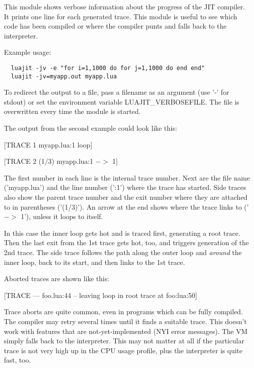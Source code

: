 This module shows verbose information about the progress of the
JIT compiler. It prints one line for each generated trace. This module
is useful to see which code has been compiled or where the compiler
punts and falls back to the interpreter.

Example usage:

\begin{lstlisting}
  luajit -jv -e "for i=1,1000 do for j=1,1000 do end end"
  luajit -jv=myapp.out myapp.lua
\end{lstlisting}
To redirect the output to a file, pass a
filename as an argument (use '-' for stdout) or set the environment
variable LUAJIT\_VERBOSEFILE. The file is overwritten every time the
module is started.

The output from the second example could look like this:

\begin{center}
[TRACE   1 myapp.lua:1 loop]

[TRACE   2 (1/3) myapp.lua:1 $->$ 1]
\end{center}

The first number in each line is the internal trace number. Next are
the file name ('myapp.lua') and the line number (':1') where the
trace has started. Side traces also show the parent trace number and
the exit number where they are attached to in parentheses ('(1/3)').
An arrow at the end shows where the trace links to ('$->$ 1'), unless
it loops to itself.

In this case the inner loop gets hot and is traced first, generating
a root trace. Then the last exit from the 1st trace gets hot, too,
and triggers generation of the 2nd trace. The side trace follows the
path along the outer loop and \textit{around} the inner loop, back to its
start, and then links to the 1st trace.

Aborted traces are shown like this:
\begin{center}
[TRACE --- foo.lua:44 -- leaving loop in root trace at foo:lua:50]
\end{center}

Trace aborts are quite common, even in programs which
can be fully compiled. The compiler may retry several times until it
finds a suitable trace. This doesn't work with features that are
not-yet-implemented (NYI error messages). The VM simply falls back to the
interpreter. This may not matter at all if the particular trace is not very high
up in the CPU usage profile, plus the interpreter is quite fast, too.